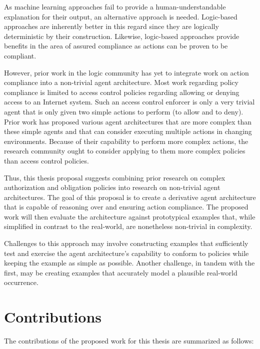 As machine learning approaches fail to provide a human-understandable explanation for their output, an alternative approach is needed.
Logic-based approaches are inherently better in this regard since they are logically deterministic by their construction.
Likewise, logic-based approaches provide benefits in the area of assured compliance as actions can be proven to be compliant.

However, prior work in the logic community has yet to integrate work on action compliance into a non-trivial agent architecture.
Most work regarding policy compliance is limited to access control policies regarding allowing or denying access to an Internet system.
Such an access control enforcer is only a very trivial agent that is only given two simple actions to perform (to allow and to deny).
Prior work has proposed various agent architectures that are more complex than these simple agents and that can consider executing multiple actions in changing environments.
Because of their capability to perform more complex actions, the research community ought to consider applying to them more complex policies than access control policies.

Thus, this thesis proposal suggests combining prior research on complex authorization and obligation policies into research on non-trivial agent architectures.
The goal of this proposal is to create a derivative agent architecture that is capable of reasoning over and ensuring action compliance.
The proposed work will then evaluate the architecture against prototypical examples that, while simplified in contrast to the real-world, are nonetheless non-trivial in complexity.

Challenges to this approach may involve constructing examples that sufficiently test and exercise the agent architecture's capability to conform to policies while keeping the example as simple as possible.
Another challenge, in tandem with the first, may be creating examples that accurately model a plausible real-world occurrence.

\section{Contributions}

The contributions of the proposed work for this thesis are summarized as follows:

